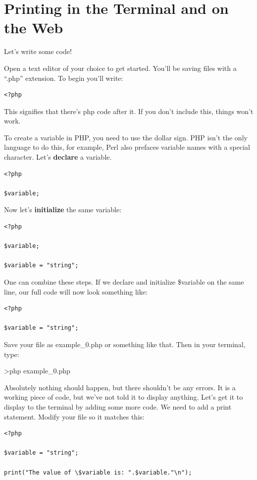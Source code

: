 \documentclass[
]{book}
\begin{document}
\hypertarget{printing}{%
\chapter{Printing in the Terminal and on the Web}\label{printing}}

Let's write some code!

Open a text editor of your choice to get started. You'll be saving files with a ``.php'' extension. To begin you'll write:

\begin{verbatim}
<?php
\end{verbatim}

This signifies that there's php code after it. If you don't include this, things won't work.

To create a variable in PHP, you need to use the dollar sign. PHP isn't the only language to do this, for example, Perl also prefaces variable names with a special character. Let's \textbf{declare} a variable.

\begin{verbatim}
<?php 

$variable;
\end{verbatim}

Now let's \textbf{initialize} the same variable:

\begin{verbatim}
<?php

$variable;

$variable = "string";
\end{verbatim}

One can combine these steps. If we declare and initialize \$variable on the same line, our full code will now look something like:

\begin{verbatim}
<?php

$variable = "string";
\end{verbatim}

Save your file as example\_0.php or something like that. Then in your terminal, type:

\textgreater php example\_0.php

Absolutely nothing should happen, but there shouldn't be any errors. It is a working piece of code, but we've not told it to display anything. Let's get it to display to the terminal by adding some more code. We need to add a print statement. Modify your file so it matches this:

\begin{verbatim}
<?php

$variable = "string";

print("The value of \$variable is: ".$variable."\n");
\end{verbatim}
\end{document}
